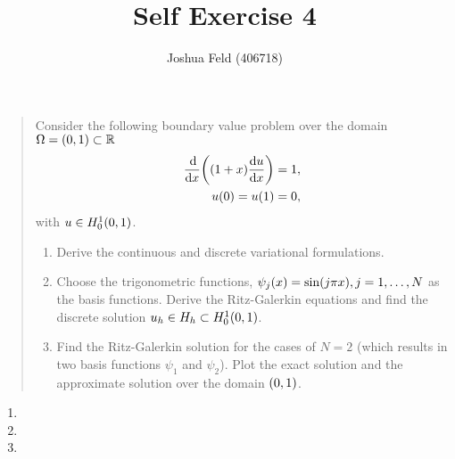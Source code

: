 \documentclass[english]{exercise}
\title{Self Exercise 4}
\author{Joshua Feld (406718)}
\begin{document}
	\maketitle


	\section{}

	\begin{quote}
		Consider the following boundary value problem over the domain \(\Omega = \parentheses*{0, 1} \subset \R\)
		\begin{align*}
			\frac{\d}{\d x}\parentheses*{\parentheses*{1 + x}\frac{\d u}{\d x}} &= 1,\\
			u\parentheses*{0} = u\parentheses*{1} &= 0,
		\end{align*}
		with \(u \in H_0^1\parentheses*{0, 1}\).
		\begin{enumerate}
			\item Derive the continuous and discrete variational formulations.
			\item Choose the trigonometric functions, \(\psi_j\parentheses*{x} = \sin\parentheses*{j\pi x}, j = 1, \ldots, N\) as the basis functions.
			Derive the Ritz-Galerkin equations and find the discrete solution \(u_h \in H_h \subset H_0^1\parentheses*{0, 1}\).
			\item Find the Ritz-Galerkin solution for the cases of \(N = 2\) (which results in two basis functions \(\psi_1\) and \(\psi_2\)).
			Plot the exact solution and the approximate solution over the domain \(\parentheses*{0, 1}\).
		\end{enumerate}
	\end{quote}

	\begin{enumerate}
		\item
		\item
		\item
	\end{enumerate}


	\section{}
\end{document}
